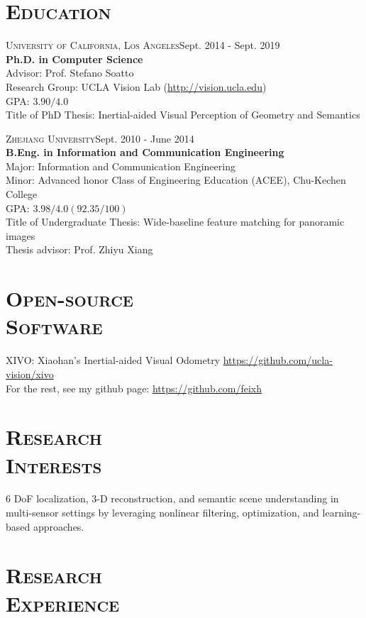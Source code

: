 \documentclass[margin, line, 10pt]{res} %
\begin{document}
\begin{resume}

\section{\textsc{Education}}
\textsc{University of California, Los Angeles}\hfill{Sept. 2014 - Sept. 2019}\\
{\bf Ph.D. in Computer Science}\\
Advisor: Prof. Stefano Soatto\\
Research Group: UCLA Vision Lab (\url{http://vision.ucla.edu})\\
GPA: $3.90/4.0$ \\
Title of PhD Thesis: Inertial-aided Visual Perception of Geometry and Semantics

\textsc{Zhejiang University}\hfill{Sept. 2010 - June 2014}\\
{\bf B.Eng. in Information and Communication Engineering}\\
Major: Information and Communication Engineering\\
Minor: Advanced honor Class of Engineering Education (ACEE), Chu-Kechen College\\
GPA: $3.98/4.0 (92.35/100)$\\
Title of Undergraduate Thesis: Wide-baseline feature matching for panoramic images\\
Thesis advisor: Prof. Zhiyu Xiang

\section{\textsc{Open-source\\Software}}
XIVO: Xiaohan's Inertial-aided Visual Odometry \url{https://github.com/ucla-vision/xivo}\\
For the rest, see my github page: \url{https://github.com/feixh}


\section{\textsc{Research\\Interests}}
6 DoF localization, 3-D reconstruction, and semantic scene understanding in multi-sensor settings by leveraging nonlinear filtering, optimization, and learning-based approaches.


\section{\textsc{Research\\Experience}}


\end{resume}
\end{document}
